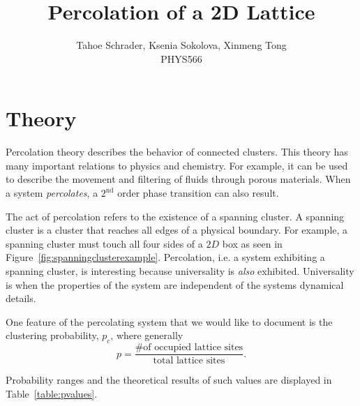 \documentclass[12pt]{article}
\title{Percolation of a 2D Lattice}
\author{Tahoe Schrader, Ksenia Sokolova, Xinmeng Tong \\PHYS566}
\date{}
\begin{document}
\maketitle



\section{Theory}
\label{sec:theory}
Percolation theory describes the behavior of connected clusters. This theory has many important relations to physics and chemistry. For example, it can be used to describe the movement and filtering of fluids through porous materials. When a system \emph{percolates}, a $2^\text{nd}$ order phase transition can also result.

The act of percolation refers to the existence of a spanning cluster. A spanning cluster is a cluster that reaches all edges of a physical boundary. For example, a spanning cluster must touch all four sides of a $2D$ box as seen in Figure~\ref{fig:spanningclusterexample}. Percolation, i.e. a system exhibiting a spanning cluster, is interesting because universality is \emph{also} exhibited. Universality is when the properties of the system are independent of the systems dynamical details.

One feature of the percolating system that we would like to document is the clustering probability, $p_c$, where generally
\begin{equation}
  \label{eq:probability}
  p = \frac{\text{\# of occupied lattice sites}}{\text{total lattice sites}}.
\end{equation}

Probability ranges and the theoretical results of such values are displayed in Table~\ref{table:pvalues}.
\begin{table}[!htb]
\end{table}
\end{document}
